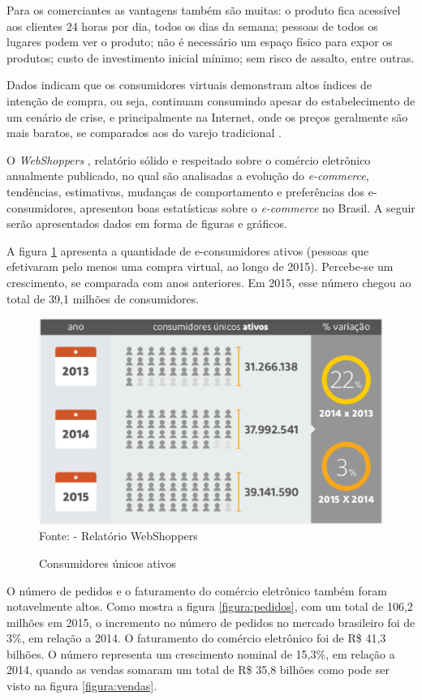 \documentclass[a4paper,12pt]{monografia}
\begin{document}
Para os comerciantes as vantagens também são muitas: o produto fica acessível aos clientes 24 horas por dia, todos os dias da semana; pessoas de todos os lugares podem ver o produto; não é necessário um espaço físico para expor os produtos; custo de investimento inicial mínimo; sem risco de assalto, entre outras.

Dados indicam que os consumidores virtuais demonstram altos índices de intenção de compra, ou seja, continuam consumindo apesar do estabelecimento de um cenário de crise, e principalmente na Internet, onde os preços geralmente são mais baratos, se comparados aos do varejo tradicional \cite{webshoppers}.

O \textit{WebShoppers} , relatório sólido e respeitado sobre o comércio eletrônico anualmente publicado, no qual são analisadas a evolução do \textit{e-commerce}, tendências, estimativas, mudanças de comportamento e preferências dos e-consumidores, apresentou boas estatísticas sobre o \textit{e-commerce} no Brasil. A seguir serão apresentados dados em forma de figuras e gráficos.

A figura \ref{figura:consumidores} apresenta a quantidade de e-consumidores ativos (pessoas que efetivaram pelo
menos uma compra virtual, ao longo de 2015). Percebe-se um crescimento, se comparada com anos anteriores. Em 2015, esse número chegou ao total de 39,1 milhões de consumidores.

\begin{figure}[H]
\centering
\caption{Consumidores únicos ativos}
\centering
\includegraphics[width=12cm]{img/webshoppers/consumidores.eps}\\
\small{Fonte:  - Relatório WebShoppers}
\label{figura:consumidores}
\end{figure}

O número de pedidos e o faturamento do comércio eletrônico também foram notavelmente altos. Como mostra a figura \ref{figura:pedidos}, com um total de 106,2 milhões em 2015, o incremento no número de pedidos no mercado brasileiro foi de 3\%, em relação a 2014. O faturamento do comércio eletrônico foi de R\$ 41,3 bilhões. O número representa um crescimento nominal de 15,3\%, em relação a 2014, quando as vendas somaram um total de R\$ 35,8 bilhões como pode ser visto na figura \ref{figura:vendas}.
\end{document}
